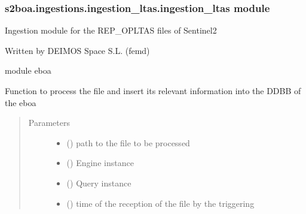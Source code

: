 \subsubsection{s2boa.ingestions.ingestion\_ltas.ingestion\_ltas module}
\label{\detokenize{s2boa.ingestions:module-s2boa.ingestions.ingestion_ltas.ingestion_ltas}}\label{\detokenize{s2boa.ingestions:s2boa-ingestions-ingestion-ltas-ingestion-ltas-module}}
\sphinxAtStartPar
Ingestion module for the REP\_OPLTAS files of Sentinel\sphinxhyphen{}2

\sphinxAtStartPar
Written by DEIMOS Space S.L. (femd)

\sphinxAtStartPar
module eboa

\begin{fulllineitems}
\label{\detokenize{s2boa.ingestions:s2boa.ingestions.ingestion_ltas.ingestion_ltas.process_file}}
\sphinxAtStartPar
Function to process the file and insert its relevant information
into the DDBB of the eboa
\begin{quote}\begin{description}
\item[{Parameters}] \leavevmode\begin{itemize}
\item {} 
\sphinxAtStartPar
{} () \textendash{} path to the file to be processed

\item {} 
\sphinxAtStartPar
{} () \textendash{} Engine instance

\item {} 
\sphinxAtStartPar
{} () \textendash{} Query instance

\item {} 
\sphinxAtStartPar
{} () \textendash{} time of the reception of the file by the triggering

\end{itemize}

\end{description}\end{quote}

\end{fulllineitems}



